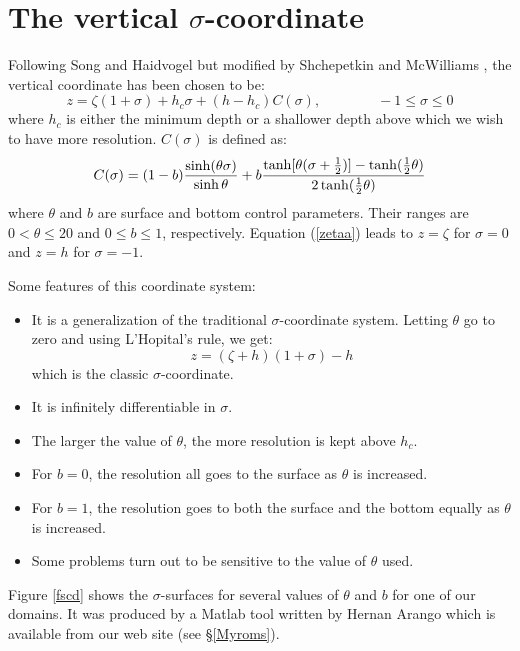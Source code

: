 \section{The vertical $\sigma$-coordinate}
\label{Scoord}

Following Song and Haidvogel \cite{Song94} but modified by
Shchepetkin and McWilliams \cite{SS2005}, the vertical coordinate has
been chosen to be:
\begin{equation}
   z = \zeta ( 1+\sigma) + h_c \sigma + (h - h_c) C(\sigma),
   \qquad \qquad -1 \leq \sigma \leq 0
\label{zetaa}
\end{equation}
where $h_c$ is either the minimum depth or a shallower depth above
which we wish to have more resolution.  $C(\sigma)$ is defined as:
\begin{equation}
   C(\sigma) = (1 - b) {\sinh (\theta \sigma) \over \sinh \theta } +
   b { \tanh [\theta ( \sigma + {1\over 2})] -
   \tanh ( {1\over 2} \theta) \over 
   2 \tanh ( {1\over 2} \theta) }
\end{equation}
where $\theta$ and $b$ are surface and bottom control parameters.
Their ranges are $0 < \theta \leq 20$ and $0 \leq b \leq 1$,
respectively.  Equation (\ref{zetaa}) leads to $z = \zeta$ for
$\sigma = 0$ and $z = h$ for $\sigma = -1$.

Some features of this coordinate system:
\begin{itemize}
   \item It is a generalization of the traditional $\sigma$-coordinate
   system.  Letting $\theta$ go to zero and using L'Hopital's rule,
   we get:
   \begin{equation}
      z = (\zeta + h)(1 + \sigma) - h
   \end{equation}
   which is the classic $\sigma$-coordinate.
   \item It is infinitely differentiable in $\sigma$.
   \item The larger the value of $\theta$, the more resolution is kept
   above $h_c$.
   \item For $b = 0$, the resolution all goes to the surface as
   $\theta$ is increased.
   \item For $b = 1$, the resolution goes to both the surface and the
   bottom equally as $\theta$ is increased.
   \item Some problems turn out to be sensitive to the value of
   $\theta$ used.
\end{itemize}
Figure \ref{fscd} shows the $\sigma$-surfaces for several values of $\theta$
and $b$ for one of our domains.  It was produced by a Matlab tool
written by Hernan Arango which is available from our web site (see
\S\ref{Myroms}).

